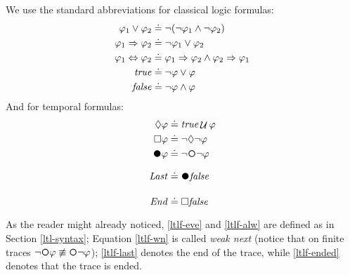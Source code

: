 We use the standard abbreviations for classical logic formulas:
\begin{align*}
	\varphi_1\lor\varphi_2 &\doteq \lnot(\lnot \varphi_1\land \lnot
	\varphi_2)\\
	\varphi_1 \Rightarrow \varphi_2 &\doteq \lnot \varphi_1 \vee \varphi_2\\
	\varphi_1 \Leftrightarrow \varphi_2 &\doteq \varphi_1 \Rightarrow \varphi_2 \wedge \varphi_2 \Rightarrow \varphi_1\\
	\mathit{true}  &\doteq \lnot \varphi \vee \varphi\\
	\mathit{false} &\doteq \lnot \varphi \wedge \varphi\\
\end{align*}
And for temporal formulas:
\begin{align}
\Diamond\varphi &\doteq \true\lUntil\varphi \label{ltlf-eve}\\
\Box\varphi &\doteq\lnot\Diamond\lnot\varphi \label{ltlf-alw}\\
\Wnext \varphi &\doteq \lnot \Next \lnot \varphi \label{ltlf-wn}\\
\Last &\doteq \Wnext\false \label{ltlf-last}\\
\Ended &\doteq \Box\false \label{ltlf-ended}
\end{align}
As the reader might already noticed, \ref{ltlf-eve} and \ref{ltlf-alw} are defined as in Section \ref{ltl-syntax};  Equation \ref{ltlf-wn} is called \emph{weak next} (notice that on finite traces $\lnot \Next \varphi \not\equiv \Next \lnot \varphi$); \ref{ltlf-last} denotes the end of the trace, while \ref{ltlf-ended} denotes that the trace is ended.

